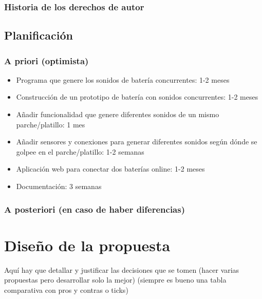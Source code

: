 \documentclass{article}
\begin{document}
\subsubsection{Historia de los derechos de autor}

\subsection{Planificación}

 \subsubsection{A priori (optimista)}

 \begin{itemize}
    \item Programa que genere los sonidos de batería concurrentes: 1-2 meses
    \item Construcción de un prototipo de batería con sonidos concurrentes: 1-2 meses
    \item Añadir funcionalidad que genere diferentes sonidos de un mismo parche/platillo: 1 mes
    \item Añadir sensores y conexiones para generar diferentes sonidos según dónde se golpee en el parche/platillo: 1-2 semanas
    \item Aplicación web para conectar dos baterías online: 1-2 meses
    \item Documentación: 3 semanas
\end{itemize}

 \subsubsection{A posteriori (en caso de haber diferencias)}
\section{Diseño de la propuesta}\label{sec:Diseno}

 Aquí hay que detallar y justificar las decisiones que se tomen (hacer varias propuestas pero desarrollar solo la mejor) (siempre es bueno una tabla comparativa con pros y contras o ticks)
\end{document}

